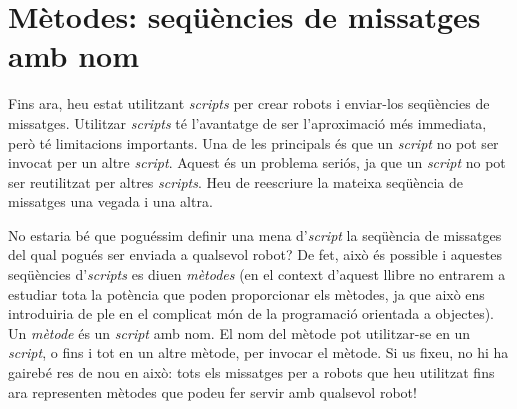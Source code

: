 \newcommand\parttres{%
  \cleardoublepage
  \thispagestyle{plain}%
  \null\vfil
   \secdef\kkpart\kkpart}
\def\kkpart[#1]#2{%
      \relax
      \refstepcounter{part}%
      \addcontentsline{toc}{part}{\thepart\hspace{1em}#1}%
    {\centering
     \interlinepenalty
     \normalfont
      \relax
       \huge\bfseries \partname\nobreakspace\thepart
       \par
       \vskip 20pt
     \Huge \bfseries #2\par}%
    \kkendpart}
\def\kkendpart{
\vspace*{3cm}
\begin{center}
\begin{minipage}{0.8\textwidth}
\textbf{ \noindent En aquesta part del llibre aprendreu a definir els vostres propis mètodes. Això us permetrà reutilitzar
seqüències de missatges, i sereu capaços de definir mètodes complexos a partir de mètodes més 
senzills.}
\end{minipage}
\end{center}
	\vfil\newpage
                \null
                \thispagestyle{empty}}

\parttres{Posar en joc l'abstracció}

\chapter{Mètodes: seqüències de missatges amb nom}
\label{cap12}

Fins ara, heu estat utilitzant \emph{scripts} per crear robots i enviar-los seqüències de missatges. Utilitzar \emph{scripts} té l'avantatge de ser l'aproximació més immediata, però té limitacions importants. Una de les principals és que un \emph{script} no pot ser invocat per un altre \emph{script}. Aquest és un problema seriós, ja que un \emph{script} no pot ser reutilitzat per altres \emph{scripts}. Heu de reescriure la mateixa seqüència de missatges una vegada i una altra.

No estaria bé que poguéssim definir una mena d'\emph{script} la seqüència de missatges del qual pogués ser enviada a qualsevol robot? De fet, això és possible i aquestes seqüències d'\emph{scripts} es diuen \emph{mètodes} (en el context d'aquest llibre no entrarem a estudiar tota la potència que poden proporcionar els mètodes, ja que això ens introduiria de ple en el complicat món de la programació orientada a objectes). Un \emph{mètode} és un \emph{script} amb nom. El nom del mètode pot utilitzar-se en un \emph{script}, o fins i tot en un altre mètode, per invocar el mètode. Si us fixeu, no hi ha gairebé res de nou en això: tots els missatges per a robots que heu utilitzat fins ara representen mètodes que podeu fer servir amb qualsevol robot!

